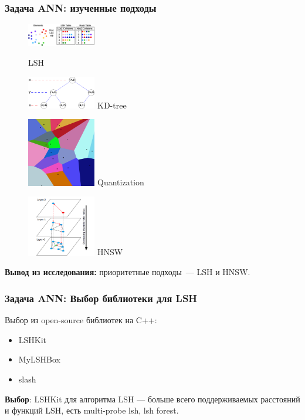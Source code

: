 \documentclass{beamer}
\begin{document}
\begin{frame}

\frametitle{Задача ANN: изученные подходы}
\begin{center}

\begin{figure}
\begin{minipage}{4cm}
\centering
\includegraphics[width=3cm]{lsh_hashtable.png}

LSH
\end{minipage}
\begin{minipage}{4cm}
\centering
\includegraphics[width=3cm]{kdtree-tree.png}
KD-tree
\end{minipage}
\end{figure}
\begin{figure}
\begin{minipage}{4cm}
\centering
\includegraphics[width=3cm]{voronoi.png}
Quantization
\end{minipage}
\begin{minipage}{4cm}
\centering
\includegraphics[width=3cm]{hnsw_graph.png}
HNSW
\end{minipage}
\end{figure}

\textbf{Вывод из исследования:} приоритетные подходы~--- LSH и HNSW.

\end{center}

\end{frame}

\begin{frame}

\frametitle{Задача ANN: Выбор библиотеки для LSH}

Выбор из open-source библиотек на C++:
\begin{itemize}
\item LSHKit
\item MyLSHBox
\item slash
\end{itemize}

\textbf{Выбор}: LSHKit для алгоритма LSH --- больше всего поддерживаемых расстояний и функций LSH, есть multi-probe lsh, lsh forest.

\end{frame}
\end{document}
